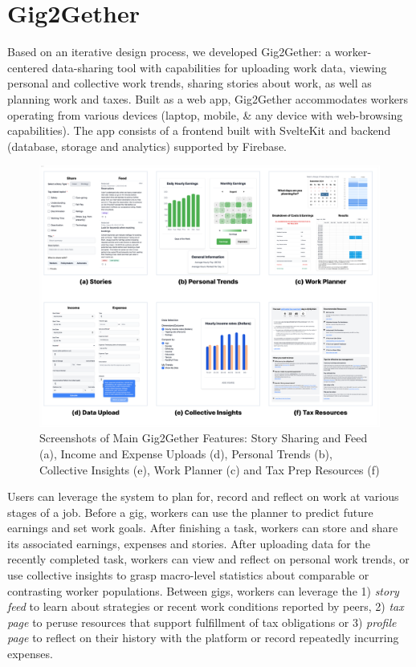\section{Gig2Gether}\label{gig2gether}
{Based on an iterative design process, we developed Gig2Gether:} a worker-centered data-sharing tool with capabilities for uploading work data, viewing personal and collective work trends, sharing stories about work, as well as planning work and taxes. 
Built as a web app, Gig2Gether accommodates workers operating from various devices (laptop, mobile, \& any device with web-browsing capabilities). The app consists of a frontend built with SvelteKit and backend (database, storage and analytics) supported by Firebase.

\begin{figure}[h!]
    \centering
    \includegraphics[width=\linewidth]{Chapters/images/overview.png}
    \caption{Screenshots of Main Gig2Gether Features: Story Sharing and Feed (a), Income and Expense Uploads (d), Personal Trends (b), Collective Insights (e), Work Planner (c) and Tax Prep Resources (f)}
    \label{overview}
\end{figure}

Users can leverage the system to plan for, record and reflect on work at various stages of a job.
Before a gig, workers can use the planner to predict future earnings and set work goals. After finishing a task, {workers can store and share its} associated earnings, expenses and stories.
After uploading data {for} the recently completed task, workers can view and reflect on personal work trends, or use collective insights to grasp macro-level statistics about comparable or contrasting worker populations. 
Between gigs, workers can leverage  the 1) \textit{story feed} to learn about strategies or recent work conditions reported by peers, 2) \textit{tax page} to peruse resources that support fulfillment of tax obligations or 3) \textit{profile page} to reflect on their history with the platform or record repeatedly incurring expenses. 

